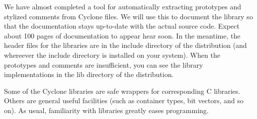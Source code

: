\newcommand{\tindex}[1]{}
\newcommand{\exindex}[1]{}

We have almost completed a tool for automatically extracting
prototypes and stylized comments from Cyclone files.  We will use this
to document the library so that the documentation stays up-to-date
with the actual source code.  Expect about 100 pages of documentation
to appear hear soon.  In the meantime, the header files for
the libraries are in the include directory of the distribution (and
whereever the include directory is installed on your system).  When
the prototypes and comments are insufficient, you can see the library
implementations in the lib directory of the distribution.

Some of the Cyclone libraries are safe wrappers for corresponding C
libraries.  Others are general useful facilities (such as container
types, bit vectors, and so on).  As usual, familiarity with libraries
greatly eases programming.








